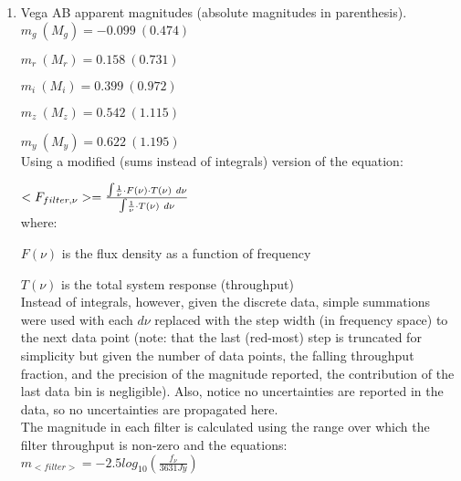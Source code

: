 \documentclass[11pt]{article}
\begin{document}
\begin{enumerate}
\begin{enumerate}
 
	 \item Vega AB apparent magnitudes (absolute magnitudes in parenthesis).\\
	 
	 \hspace{10mm}$m_{g}\ (M_{g}) = -0.099\ (0.474)$
	 
	 \hspace{10mm}$m_{r}\ (M_{r}) = 0.158\ (0.731)$
	 	  
	 \hspace{10mm}$m_{i}\ (M_{i}) =  0.399\ (0.972)$
	 
	 \hspace{10mm}$m_{z}\ (M_{z}) = 0.542\ (1.115)$
	 
	 \hspace{10mm}$m_{y}\ (M_{y}) = 0.622\ (1.195)$\\
	 	 
	 Using a modified (sums instead of integrals) version of the equation:
		 
		 	\hspace{10mm} $<F_{filter,\nu}> = \frac{\mathlarger{\int} \frac{1}{\nu} \cdot F(\nu) \cdot T(\nu)\ d\nu}{\mathlarger{\int} \frac{1}{\nu} \cdot T(\nu)\ d\nu}$ \\
		 	
		 	where:
		 	
		 	 \hspace {10mm}$F(\nu)$ is the flux density as a function of frequency 
		 	 
		 	 \hspace{10mm} $T(\nu)$ is the total system response (throughput)\\
		 	 
 	 
		Instead of integrals, however, given the discrete data, simple summations were used with each $d\nu$ replaced with the step width (in frequency space) to the next data point (note: that the last (red-most) step is truncated for simplicity but given the number of data points, the falling throughput fraction, and the precision of the magnitude reported, the contribution of the last data bin is negligible). Also, notice no uncertainties are reported in the data, so no uncertainties are propagated here.\\
		
		The magnitude in each filter is calculated using the range over which the filter throughput is non-zero and the equations:\\
			
			 \hspace{10mm} $m_{<filter>} = -2.5 log_{10}(\frac{f_{\nu}}{3631 Jy})$\\
			 

\end{enumerate}
\end{enumerate}
\end{document}
